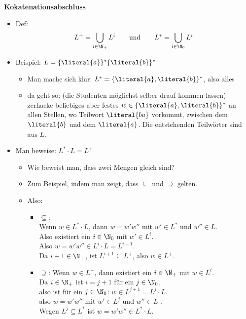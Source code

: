 \begin{tutorium}
  \noindent\textbf{Kokatenationsabschluss}
  \begin{itemize}
  \item Def: 
    \begin{equation*}
      L^+ = \bigcup_{i\in\N_+} L^i \text{\qquad und\qquad}
      L^* = \bigcup_{i\in\N_0} L^i
    \end{equation*}
  \item Beispiel: $L=\{\literal{a}\}^*\{\literal{b}\}^*$
    \begin{itemize}
    \item Man mache sich klar: $L^* = \{\literal{a},\literal{b}\}^*$, also
      alles
    \item da geht \zB so: (die Studenten möglichst selber drauf kommen lassen)
      zerhacke beliebiges aber festes $w\in \{\literal{a},\literal{b}\}^*$ an
      allen Stellen, wo Teilwort $\literal{ba}$ vorkommt, zwischen dem
      $\literal{b}$ und dem $\literal{a}$.
      Die entstehenden Teilwörter sind aus $L$.
    \end{itemize}
  \item Man beweise:  $ L^*\cdot L = L^+$
    \begin{itemize}
    \item Wie beweist man, dass zwei Mengen gleich sind?
    \item Zum Beispiel, indem man zeigt, dass $\subseteq$ und
      $\supseteq$ gelten.
    \item Also:
      \begin{itemize}
      \item $\subseteq$: \\
        Wenn $w\in L^*\cdot L$, dann $w=w'w''$ mit
        $w'\in L^*$ und $w''\in L$. \\
        Also existiert ein $i\in\N_0$ mit $w'\in L^i$.\\
        Also $w=w'w''\in L^i\cdot L = L^{i+1}$. \\
        Da $i+1\in\N_+$, ist $L^{i+1}\subseteq L^+$, also $w\in L^+$.
      \item $\supseteq$: Wenn $w\in L^+$, dann existiert ein $i\in\N_+$
        mit $w\in L^i$. \\
        Da $i\in \N_+$ ist $i=j+1$ für ein $j\in\N_0$, \\
        also ist für ein $j\in\N_0$: $w\in L^{j+1}= L^j\cdot L$. \\
        also $w=w'w''$ mit $w'\in L^j$ und $w''\in L$ . \\
        Wegen $L^j\subseteq L^*$ ist $w=w'w''\in L^*\cdot L$.
      \end{itemize}
    \end{itemize}
  \end{itemize}
\end{tutorium}

